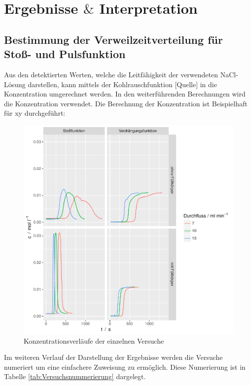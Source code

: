 \documentclass[12pt,liststotoc]{report}
\begin{document}
\chapter{Ergebnisse $\&$ Interpretation}

\section{Bestimmung der Verweilzeitverteilung für Stoß- und Pulsfunktion}


   

Aus den detektierten Werten, welche die Leitfähigkeit der verwendeten NaCl-Lösung darstellen, kann mittels der Kohlrauschfunktion [Quelle] in die Konzentration umgerechnet werden. In den weiterführenden Berechnungen wird die Konzentration verwendet. Die Berechnung der Konzentration ist Beispielhaft für xy durchgeführt:



\begin{figure}[H]
\centering
\includegraphics[width=1\textwidth]{Graphics/ct.pdf}
\caption[Konzentrationsverläufe]{Konzentrationsverläufe der einzelnen Versuche}
\label{konzentrationsverlauf}
\end{figure}
\noindent
Im weiteren Verlauf der Darstellung der Ergebnisse werden die Versuche numeriert um eine einfachere Zuweisung zu ermöglich. Diese Numerierung ist in Tabelle \ref{tab:Versuchsnummerierung} dargelegt.
\end{document}
